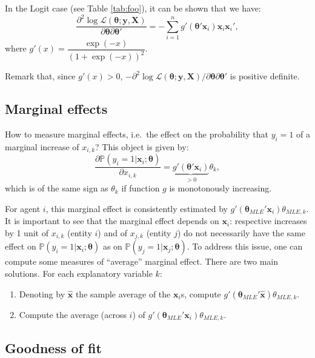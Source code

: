 \documentclass[
  12pt,
]{book}
\providecommand{\tightlist}{%
  \setlength{\itemsep}{0pt}\setlength{\parskip}{0pt}}
\theoremstyle{definition}
\theoremstyle{definition}
\theoremstyle{definition}
\theoremstyle{definition}
\theoremstyle{remark}
\begin{document}
In the Logit case (see Table \ref{tab:foo}), it can be shown that we have:
\[
\frac{\partial^2 \log \mathcal{L}(\boldsymbol\theta;\mathbf{y},\mathbf{X})}{\partial \boldsymbol\theta \partial \boldsymbol\theta'} = - \sum_{i=1}^{n} g'(\boldsymbol\theta'\mathbf{x}_i) \mathbf{x}_i\mathbf{x}_i',
\]
where \(g'(x)=\dfrac{\exp(-x)}{(1 + \exp(-x))^2}\).

Remark that, since \(g'(x)>0\), \(-\partial^2 \log \mathcal{L}(\boldsymbol\theta;\mathbf{y},\mathbf{X})/\partial \boldsymbol\theta \partial \boldsymbol\theta'\) is positive definite.

\hypertarget{marginalFX}{%
\subsection{Marginal effects}\label{marginalFX}}

How to measure marginal effects, i.e.~the effect on the probability that \(y_i=1\) of a marginal increase of \(x_{i,k}\)? This object is given by:
\[
\frac{\partial \mathbb{P}(y_i=1|\mathbf{x}_i;\boldsymbol\theta)}{\partial x_{i,k}} = \underbrace{g'(\boldsymbol\theta'\mathbf{x}_i)}_{>0}\theta_k,
\]
which is of the same sign as \(\theta_k\) if function \(g\) is monotonously increasing.

For agent \(i\), this marginal effect is consistently estimated by \(g'(\boldsymbol\theta_{MLE}'\mathbf{x}_i)\theta_{MLE,k}\). It is important to see that the marginal effect depends on \(\mathbf{x}_i\): respective increases by 1 unit of \(x_{i,k}\) (entity \(i\)) and of \(x_{j,k}\) (entity \(j\)) do not necessarily have the same effect on \(\mathbb{P}(y_i=1|\mathbf{x}_i;\boldsymbol\theta)\) as on \(\mathbb{P}(y_j=1|\mathbf{x}_j;\boldsymbol\theta)\). To address this issue, one can compute some measures of ``average'' marginal effect. There are two main solutions. For each explanatory variable \(k\):

\begin{enumerate}
\def\labelenumi{\roman{enumi}.}
\tightlist
\item
  Denoting by \(\hat{\mathbf{x}}\) the sample average of the \(\mathbf{x}_i\)s, compute \(g'(\boldsymbol\theta_{MLE}'\hat{\mathbf{x}})\theta_{MLE,k}\).
\item
  Compute the average (across \(i\)) of \(g'(\boldsymbol\theta_{MLE}'\mathbf{x}_i)\theta_{MLE,k}\).
\end{enumerate}

\hypertarget{goodness-of-fit-1}{%
\subsection{Goodness of fit}\label{goodness-of-fit-1}}
\end{document}
